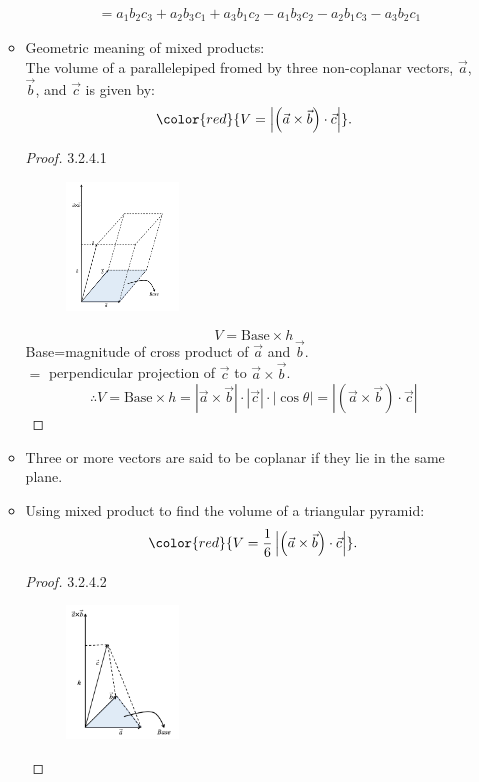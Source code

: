 \documentclass[12pt, a4paper]{article}
\begin{document}
\begin{enumerate}
\begin{itemize}
$$\begin{aligned}
      &=a_1b_2c_3+a_2b_3c_1+a_3b_1c_2-a_1b_3c_2-a_2b_1c_3-a_3b_2c_1
    \end{aligned}$$
    \item Geometric meaning of mixed products: \\
    The volume of a parallelepiped fromed by three non-coplanar vectors, $\vec{a}$, $\vec{b}$, and $\vec{c}$ is given by: 
    $${\color{red}{V=\left|\left(\vec{a}\times\vec{b}\right)\cdot\vec{c}\right|}}.$$
    \begin{proof}{3.2.4.1}{}
      \begin{figure}[H]
        \centering
        \includegraphics[width=0.3\textwidth]{Fig.3.10.jpg}
      \end{figure}
      $$V=\text{Base}\times h$$
      Base=magnitude of cross product of $\vec{a}$ and $\vec{b}$.\\
      $=$ perpendicular projection of $\vec{c}$ to $\vec{a}\times\vec{b}$.\\
      $$\therefore V=\text{Base}\times h=\left|\vec{a}\times\vec{b}\right|\cdot\left|\vec{c}\right|\cdot\left|\cos\theta\right|=\left|\left(\vec{a}\times\vec{b}\right)\cdot\vec{c}\right|$$
    \end{proof}
    \item Three or more vectors are said to be coplanar if they lie in the same plane.
    \item Using mixed product to find the volume of a triangular pyramid: 
    $${\color{red}{V=\frac{1}{6}\left|\left(\vec{a}\times\vec{b}\right)\cdot\vec{c}\right|}}.$$
    \begin{proof}{3.2.4.2}{}
      \begin{figure}[H]
        \centering
        \includegraphics[width=0.3\textwidth]{Fig.3.11.jpg}

\end{figure}
\end{proof}
\end{itemize}
\end{enumerate}
\end{document}
